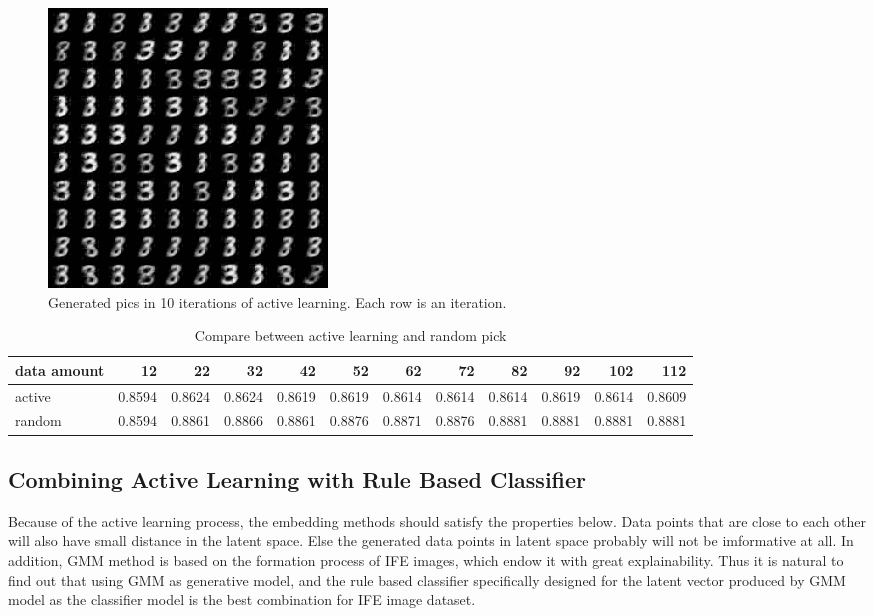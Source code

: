 \documentclass[10pt,twocolumn,letterpaper]{article}
\begin{document}
\begin{figure}[t]
    \begin{center}
       \includegraphics[width=0.8\linewidth]{active_process.png}
    \end{center}
       \caption{Generated pics in 10 iterations of active learning. Each row is an iteration.}
    \end{figure}

\begin{table}
    \centering
    \caption{Compare between active learning and random pick}
      \begin{tabular}{lrrrrrrrrrrr}
        \hline
      data amount & 12    & 22    & 32    & 42    & 52    & 62    & 72    & 82    & 92    & 102   & 112 \\
      \hline
      active & 0.8594  & 0.8624  & 0.8624  & 0.8619  & 0.8619  & 0.8614  & 0.8614  & 0.8614  & 0.8619  & 0.8614  & 0.8609  \\
      random & 0.8594  & 0.8861  & 0.8866  & 0.8861  & 0.8876  & 0.8871  & 0.8876  & 0.8881  & 0.8881  & 0.8881  & 0.8881  \\
      \hline
      \end{tabular}%
    \label{tab:addlabel}%
  \end{table}%
  
  

\subsection{Combining Active Learning with Rule Based Classifier}
Because of the active learning process, the embedding methods should satisfy the properties below. Data points that are close to each other will also have small distance in the latent space. Else the generated data points in latent space probably will not be imformative at all. In addition, GMM method is based on the formation process of IFE images, which endow it with great explainability. Thus it is natural to find out that using GMM as generative model, and the rule based classifier specifically designed for the latent vector produced by GMM model as the classifier model is the best combination for IFE image dataset.
\end{document}
